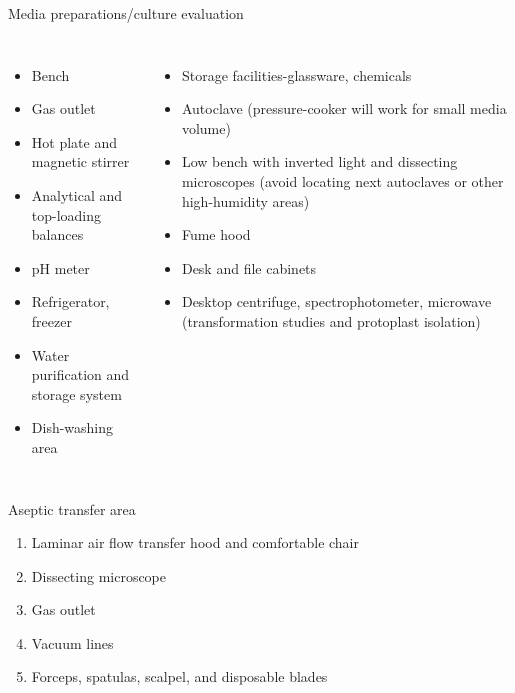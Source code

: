 \documentclass[
  ignorenonframetext,
  aspectratio=169]{beamer}
\providecommand{\tightlist}{%
  \setlength{\itemsep}{0pt}\setlength{\parskip}{0pt}}
\begin{document}
\begin{frame}{Media preparations/culture evaluation}
\protect\hypertarget{media-preparationsculture-evaluation}{}
\begin{columns}[T,onlytextwidth]
  \begin{itemize}

  \item Bench
  \item Gas outlet
  \item Hot plate and magnetic stirrer
  \item Analytical and top-loading balances
  \item pH meter
  \item Refrigerator, freezer
  \item Water purification and storage system
  \item Dish-washing area
  \end{itemize}

  
  \begin{itemize}

  \item Storage facilities-glassware, chemicals
  \item Autoclave (pressure-cooker will work for small media volume)
  \item Low bench with inverted light and dissecting microscopes (avoid locating next autoclaves or other high-humidity areas)
  \item Fume hood
  \item Desk and file cabinets
  \item Desktop centrifuge, spectrophotometer, microwave (transformation studies and protoplast isolation)

  \end{itemize}

\end{columns}
\end{frame}

\begin{frame}{Aseptic transfer area}
\protect\hypertarget{aseptic-transfer-area}{}
\begin{enumerate}
\tightlist
\item
  Laminar air flow transfer hood and comfortable chair
\item
  Dissecting microscope
\item
  Gas outlet
\item
  Vacuum lines
\item
  Forceps, spatulas, scalpel, and disposable blades
\end{enumerate}
\end{frame}
\end{document}
